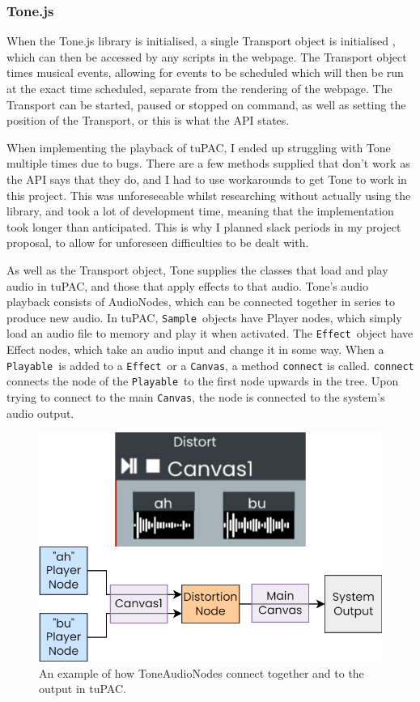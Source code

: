 \documentclass[12pt,a4paper,oneside,openright]{report}
\newcommand{\canvas}{\texttt{Canvas}}
\newcommand{\playable}{\texttt{Playable}}
\newcommand{\sample}{\texttt{Sample}}
\newcommand{\effect}{\texttt{Effect}}
\begin{document}
\subsubsection{Tone.js}
When the Tone.js library is initialised, a single Transport object is initialised \cite{Transport}, which can then be accessed by any scripts in the webpage. The Transport object times musical events, allowing for events to be scheduled which will then be run at the exact time scheduled, separate from the rendering of the webpage. The Transport can be started, paused or stopped on command, as well as setting the position of the Transport, or this is what the API states.

When implementing the playback of tuPAC, I ended up struggling with Tone multiple times due to bugs. There are a few methods supplied that don't work as the API says that they do, and I had to use workarounds to get Tone to work in this project. This was unforeseeable whilst researching without actually using the library, and took a lot of development time, meaning that the implementation took longer than anticipated. This is why I planned slack periods in my project proposal, to allow for unforeseen difficulties to be dealt with.

As well as the Transport object, Tone supplies the classes that load and play audio in tuPAC, and those that apply effects to that audio. Tone's audio playback consists of AudioNodes, which can be connected together in series to produce new audio. In tuPAC, \sample\ objects have Player nodes, which simply load an audio file to memory and play it when activated. The \effect\ object have Effect nodes, which take an audio input and change it in some way. When a \playable\ is added to a \effect\ or a \canvas, a method \verb|connect| is called. \verb|connect| connects the node of the \playable\ to the first node upwards in the tree. Upon trying to connect to the main \canvas, the node is connected to the system's audio output.

\begin{figure}[h]
    \centering
    \includegraphics[scale=0.5]{images/node_diagram.png}
    \caption{An example of how ToneAudioNodes connect together and to the output in tuPAC.}
    \label{fig:node_diagram}
\end{figure}
\end{document}
